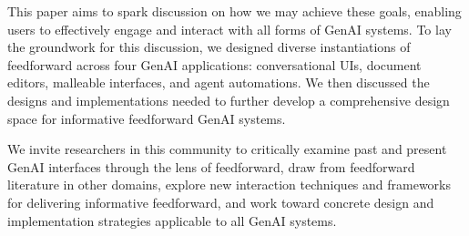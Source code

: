 This paper aims to spark discussion on how we may achieve these goals, enabling users to effectively engage and interact with all forms of GenAI systems.
To lay the groundwork for this discussion, we designed diverse instantiations of feedforward across four GenAI applications: conversational UIs, document editors, malleable interfaces, and agent automations. We then discussed the designs and implementations needed to further develop a comprehensive design space for informative feedforward GenAI systems.

We invite researchers in this community to critically examine past and present GenAI interfaces through the lens of feedforward, draw from feedforward literature in other domains, explore new interaction techniques and frameworks for delivering informative feedforward, and work toward concrete design and implementation strategies applicable to all GenAI systems.









